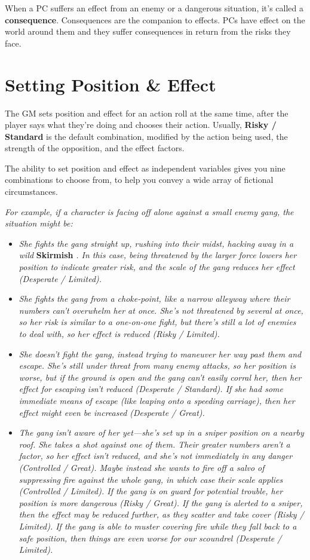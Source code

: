\documentclass[11pt,oneside]{book}
\newcommand{\gameterm}[1]{\textbf{#1}}
\begin{document}
When a PC suffers an effect from an enemy or a dangerous situation, it’s called a \textbf{consequence}. Consequences are the companion to effects. PCs have effect on the world around them and they suffer consequences in return from the risks they face.

\chapter{Setting Position \& Effect}

The GM sets position and effect for an action roll at the same time, after the player says what they’re doing and chooses their action. Usually, \textbf{Risky / Standard} is the default combination, modified by the action being used, the strength of the opposition, and the effect factors.

The ability to set position and effect as independent variables gives you nine combinations to choose from, to help you convey a wide array of fictional circumstances.

\emph{For example, if a character is facing off alone against a small enemy gang, the situation might be:}

\begin{itemize}
	\item \emph{She fights the gang straight up, rushing into their midst, hacking away in a wild }\gameterm{Skirmish} \emph{. In this case, being threatened by the larger force lowers her position to indicate greater risk, and the scale of the gang reduces her effect (Desperate / Limited).}
	\item \emph{She fights the gang from a choke-point, like a narrow alleyway where their numbers can’t overwhelm her at once. She’s not threatened by several at once, so her risk is similar to a one-on-one fight, but there’s still a lot of enemies to deal with, so her effect is reduced (Risky / Limited).}
	\item \emph{She doesn’t fight the gang, instead trying to maneuver her way past them and escape. She’s still under threat from many enemy attacks, so her position is worse, but if the ground is open and the gang can’t easily corral her, then her effect for escaping isn’t reduced (Desperate / Standard). If she had some immediate means of escape (like leaping onto a speeding carriage), then her effect might even be increased (Desperate / Great).}
	\item \emph{The gang isn’t aware of her yet---she’s set up in a sniper position on a nearby roof. She takes a shot against one of them. Their greater numbers aren’t a factor, so her effect isn’t reduced, and she’s not immediately in any danger (Controlled / Great). Maybe instead she wants to fire off a salvo of suppressing fire against the whole gang, in which case their scale applies (Controlled / Limited). If the gang is on guard for potential trouble, her position is more dangerous (Risky / Great). If the gang is alerted to a sniper, then the effect may be reduced further, as they scatter and take cover (Risky / Limited). If the gang is able to muster covering fire while they fall back to a safe position, then things are even worse for our scoundrel (Desperate / Limited).}
\end{itemize}
\end{document}

